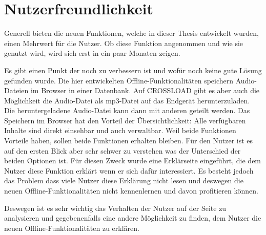 \section{Nutzerfreundlichkeit}
Generell bieten die neuen Funktionen, welche in dieser Thesis entwickelt wurden, einen Mehrwert für die Nutzer. Ob diese Funktion angenommen und wie sie genutzt wird, wird sich erst in ein paar Monaten zeigen. 

Es gibt einen Punkt der noch zu verbessern ist und wofür noch keine gute Lösung gefunden wurde. Die hier entwickelten Offline-Funktionalitäten speichern Audio-Dateien im Browser in einer Datenbank. Auf CROSSLOAD gibt es aber auch die Möglichkeit die Audio-Datei als mp3-Datei auf das Endgerät herunterzuladen. Die heruntergeladene Audio-Datei kann dann mit anderen geteilt werden. Das Speichern im Browser hat den Vorteil der Übersichtlichkeit: Alle verfügbaren Inhalte sind direkt einsehbar und auch verwaltbar. Weil beide Funktionen Vorteile haben, sollen beide Funktionen erhalten bleiben. Für den Nutzer ist es auf den ersten Blick aber sehr schwer zu verstehen was der Unterschied der beiden Optionen ist. Für diesen Zweck wurde eine Erklärseite eingeführt, die dem Nutzer diese Funktion erklärt wenn er sich dafür interessiert. Es besteht jedoch das Problem dass viele Nutzer diese Erklärung nicht lesen und deswegen die neuen Offline-Funktionalitäten nicht kennenlernen und davon profitieren können. 

Deswegen ist es sehr wichtig das Verhalten der Nutzer auf der Seite zu analysieren und gegebenenfalls eine andere Möglichkeit zu finden, dem Nutzer die neuen Offline-Funktionalitäten zu erklären.
